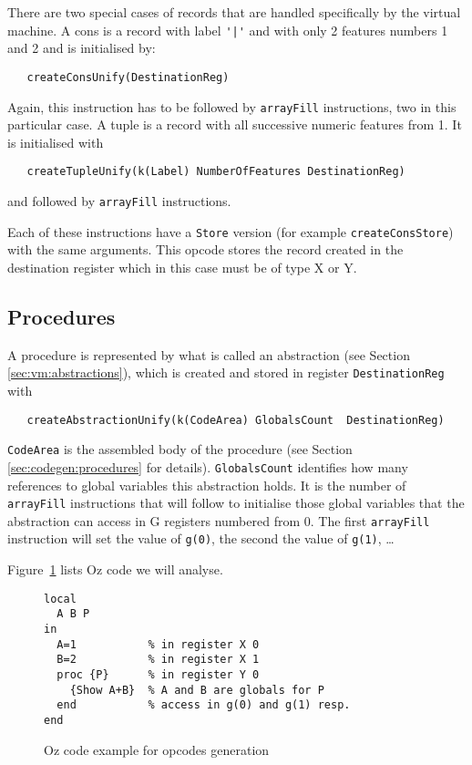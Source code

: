 \documentclass[a4paper]{memoir}
\begin{document}
There are two special cases of records that are handled specifically by the virtual machine.
A cons is a record with label \lstinline!'|'! and with only 2 features numbers 1
and 2 and is initialised by:
\begin{lstlisting}
   createConsUnify(DestinationReg)
\end{lstlisting}
Again, this instruction has to be
followed by \lstinline!arrayFill! instructions, two in this particular case.
A tuple is a record with all successive numeric features from 1. It is initialised with 
\begin{lstlisting}
   createTupleUnify(k(Label) NumberOfFeatures DestinationReg)
\end{lstlisting}
and followed by \lstinline!arrayFill! instructions.

Each of these instructions have a \lstinline!Store! version (for example
\lstinline!createConsStore!) with the same arguments. This opcode stores the
record created in the destination register which in this case must be of type X
or Y.

\subsection{Procedures}\label{sec:opcode:procedures}
A procedure is represented by what is called an abstraction (see Section
\ref{sec:vm:abstractions}), which is created and stored in register
\lstinline!DestinationReg! with
\begin{lstlisting}
   createAbstractionUnify(k(CodeArea) GlobalsCount  DestinationReg)
\end{lstlisting}
\lstinline!CodeArea! is the assembled body of the procedure (see Section
\ref{sec:codegen:procedures} for details). \lstinline!GlobalsCount! identifies
how many references to global variables this abstraction holds. It is the number
of \lstinline!arrayFill! instructions that will follow to initialise those global variables
that the abstraction can access in G registers numbered from 0. The first
\lstinline!arrayFill! instruction will set the value of \lstinline!g(0)!, the
second the value of \lstinline!g(1)!,
\ldots

Figure~\ref{fig:opcodes:procedures:example} lists Oz code we will analyse.

\begin{figure}[ht]
\begin{lstlisting}
local
  A B P
in
  A=1           % in register X 0
  B=2           % in register X 1
  proc {P}      % in register Y 0
    {Show A+B}  % A and B are globals for P
  end           % access in g(0) and g(1) resp.
end
\end{lstlisting}
\caption{Oz code example for opcodes generation}
\label{fig:opcodes:procedures:example}
\end{figure}
\end{document}
